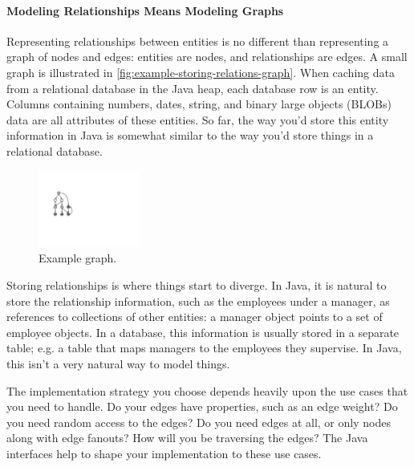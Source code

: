 \paragraph{Modeling Relationships Means Modeling Graphs}
Representing relationships between entities is no different than representing a
graph of nodes and edges: entities are nodes, and relationships are edges. A
small graph is illustrated in \autoref{fig:example-storing-relations-graph}.
When caching data from a relational database in the Java heap, each
database row is an entity. Columns containing numbers, dates, string, and binary
large objects (BLOBs) data are all attributes of these entities. So far, the way
you'd store this entity information in Java is somewhat similar to the way you'd
store things in a relational database.


\begin{figure}
    \centering
	\includegraphics[width=0.3\textwidth]{part3/Figures/assessing/exampleGraph}
	\caption{Example graph.}
    \label{fig:example-storing-relations-graph}
\end{figure}

Storing relationships is where things start to diverge. In Java, it is natural
to store the relationship information, such as the employees under a manager, as
references to collections of other entities: a manager object points to a set of
employee objects. In a database, this information is usually stored in a
separate table; e.g. a table that maps managers to the employees they supervise.
In Java, this isn't a very natural way to model things.

The implementation strategy you choose depends heavily upon the use cases that
you need to handle. Do your edges have properties, such as an edge weight? Do
you need random access to the edges? Do you need edges at all, or only nodes
along with edge fanouts? How will you be traversing the edges? The Java
interfaces help to shape your implementation to these use cases.

